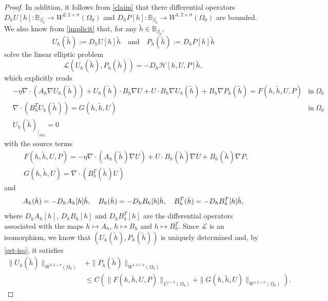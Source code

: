 \documentclass[11pt,a4paper]{amsart}
\theoremstyle{remark}
\theoremstyle{definition}
\numberwithin{equation}{section}
\numberwithin{proposition}{section}
\begin{document}
\begin{proof}
In addition, it follows from \eqref{claim} that there differential operators $D_h U[h] : \mathbb{B}_{\beta_0}\rightarrow W^{2, 2+\sigma}(\Omega_0)$ and $D_h P[h] : \mathbb{B}_{\beta_0}\rightarrow W^{1,2+\sigma}(\Omega_0)$ are bounded. We also know from \eqref{implicit} that, for any $\tilde h\in \mathbb{B}_{\beta_0}$,  $$U_h(\tilde{h}):=D_h U[h] \tilde{h}\quad \text{and} \quad P_h(\tilde{h}):=D_h P[h] \tilde{h}$$ solve the linear elliptic problem
\begin{equation*}
\mathcal{L}( U_h(\tilde{h}), P_h(\tilde{h}) )= - D_h\mathcal{H}[h, U, P]\tilde{h},
\end{equation*} which explicitly reads
\begin{equation*}
\begin{aligned}
&-\eta\nabla \cdot (A_h\nabla U_h(\tilde{h})) + U_h(\tilde{h}) \cdot B_h\nabla U + U \cdot B_h\nabla U_h(\tilde{h}) + B_h\nabla P_h(\tilde{h})= F(h, \tilde{h}, U, P)
&\mbox{in} \ \Omega_0 \\[5pt]
&\nabla \cdot (B_h^T U_h(\tilde{h})) = G(h, \tilde{h}, U) &\mbox{in} \ \Omega_0\\[5pt]
&U_h(\tilde{h})_{|_{\partial \Omega_0}}=0
\end{aligned}
\end{equation*}
with the source terms
\begin{equation*}\begin{aligned}
    &F(h, \tilde{h}, U, P)=-\eta \nabla \cdot (A_h(\tilde{h})\nabla U) + U\cdot B_h(\tilde{h})\nabla U + B_h(\tilde{h})\nabla P,\\[5pt]&
    G(h, \tilde{h}, U)= \nabla \cdot ( B^T_h(\tilde{h}) U)
    \end{aligned}
\end{equation*}
and
\begin{equation*}
A_h(\tilde{h})=- D_h A_h[h]\tilde{h}, \quad
B_h(\tilde{h})= -D_h B_h[h]\tilde{h},\quad
B_h^T(\tilde{h})= -D_h B_h^T[h]\tilde{h}, \\[5pt]
\end{equation*} where $D_h A_h[h]$, $ D_h B_h[h]$ and $D_h B_h^T[h]$ are the differential operators associated with the maps $h\mapsto A_h$, $h\mapsto B_h$ and $h\mapsto B_h^T$.
Since $\mathcal{L}$ is an isomorphism, we know that $(U_h(\tilde{h}), P_h(\tilde{h}))$ is uniquely determined and, by \eqref{est-iso}, it satisfies
\begin{equation}\label{est-appdiff}\begin{aligned}
    \|U_h(\tilde{h})\|_{W^{2, 2+\sigma}(\Omega_0)} &+ \|P_h(\tilde{h})\|_{W^{1, 2+\sigma}(\Omega_0)} \\[5pt]&\leq C \left( \|F(h, \tilde{h}, U, P)\|_{L^{2+\sigma}(\Omega_0)} + \|G(h, \tilde{h}, U)\|_{W^{1, 2+\sigma}(\Omega_0)} \right).\end{aligned}

\end{equation}
\end{proof}
\end{document}
